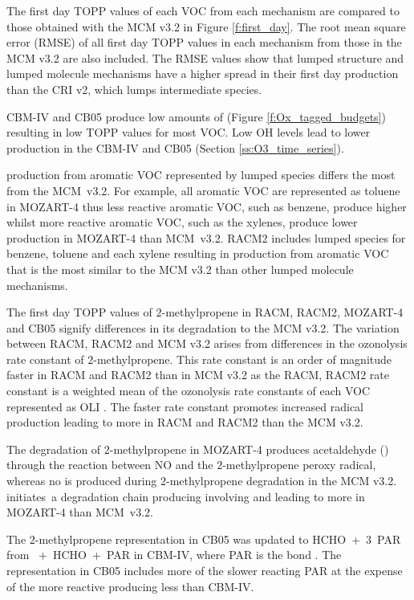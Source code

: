 The first day TOPP values of each VOC from each mechanism are compared to those obtained with the MCM v3.{2} in Figure \ref{f:first_day}.
The root mean square error (RMSE) of all first day TOPP values in each mechanism from those in the MCM v3.2 are also included.
The RMSE values show that lumped structure and lumped molecule mechanisms have a higher spread in their first day  production than the CRI v2, which lumps intermediate species.

CBM-IV and CB05 produce low amounts of  (Figure \ref{f:Ox_tagged_budgets}) resulting in low TOPP values for most VOC.
Low OH levels lead to lower  production in the CBM-IV and CB05 (Section \ref{ss:O3_time_series}).

 production from aromatic VOC represented by lumped species differs the most from the \mbox{MCM v3.2}.
For example, all aromatic VOC are represented as toluene in MOZART-4 thus less reactive aromatic VOC, such as benzene, produce higher  whilst more reactive aromatic VOC, such as the xylenes, produce lower  production in MOZART-4 than \mbox{MCM v3.2}.
RACM2 includes lumped species for benzene, toluene and each xylene resulting in  production from aromatic VOC that is the most similar to the MCM v3.2 than other lumped molecule mechanisms.

The first day TOPP values of $2$-methylpropene in RACM, RACM2, MOZART-4 and CB05 signify differences in its degradation to the MCM v3.2.
The variation between RACM, RACM2 and MCM v3.2 arises from differences in the ozonolysis rate constant of $2$-methylpropene.
This rate constant is an order of magnitude faster in RACM and RACM2 than in MCM v3.2 as the RACM, RACM2 rate constant is a weighted mean of the ozonolysis rate constants of each VOC represented as OLI \citep{Stockwell:1997, Goliff:2013}.
The faster rate constant promotes increased radical production leading to more  in RACM and RACM2 than the MCM v3.2.

The degradation of $2$-methylpropene in MOZART-4 produces acetaldehyde () through the reaction between NO and the $2$-methylpropene peroxy radical, whereas no  is produced during $2$-methylpropene degradation in the MCM v3.2.
 \mbox{initiates a} degradation chain producing  involving  and  leading to more  in MOZART-4 than \mbox{MCM v3.2}.

The $2$-methylpropene representation in CB05 was updated to \mbox{HCHO + $3$ PAR} from \mbox{ + HCHO + PAR} in CBM-IV, where PAR is the  bond \citep{Gery:1989, Yarwood:2005}.
The representation in CB05 includes more of the slower reacting PAR at the expense of the more reactive  producing less  than CBM-IV.

